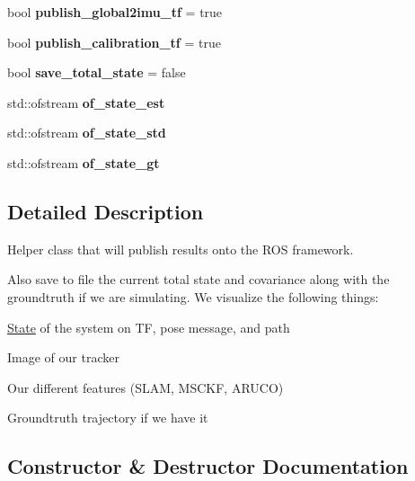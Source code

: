 \begin{DoxyCompactItemize}
bool {\bfseries publish\+\_\+global2imu\+\_\+tf} = true
\item 
\mbox{\label{classov__msckf_1_1ROS1Visualizer_a5e0ae19091760130725778ccf4efba9d}} 
bool {\bfseries publish\+\_\+calibration\+\_\+tf} = true
\item 
\mbox{\label{classov__msckf_1_1ROS1Visualizer_a85f127c8763177c8f99a4989f0fa1057}} 
bool {\bfseries save\+\_\+total\+\_\+state} = false
\item 
\mbox{\label{classov__msckf_1_1ROS1Visualizer_a76dcf1acce0ae297a24f552cb3cc7885}} 
std\+::ofstream {\bfseries of\+\_\+state\+\_\+est}
\item 
\mbox{\label{classov__msckf_1_1ROS1Visualizer_a59895c91ee29491b530a1330cf2e229e}} 
std\+::ofstream {\bfseries of\+\_\+state\+\_\+std}
\item 
\mbox{\label{classov__msckf_1_1ROS1Visualizer_a17caba0b49b67b146003f96163b46cab}} 
std\+::ofstream {\bfseries of\+\_\+state\+\_\+gt}
\end{DoxyCompactItemize}


\subsection{Detailed Description}
Helper class that will publish results onto the R\+OS framework. 

Also save to file the current total state and covariance along with the groundtruth if we are simulating. We visualize the following things\+:
\begin{DoxyItemize}
\item \hyperlink{classov__msckf_1_1State}{State} of the system on TF, pose message, and path
\item Image of our tracker
\item Our different features (S\+L\+AM, M\+S\+C\+KF, A\+R\+U\+CO)
\item Groundtruth trajectory if we have it 
\end{DoxyItemize}

\subsection{Constructor \& Destructor Documentation}
\mbox{\label{classov__msckf_1_1ROS1Visualizer_abd76c037fd103010fcdb74d2d9f9e391}} 

